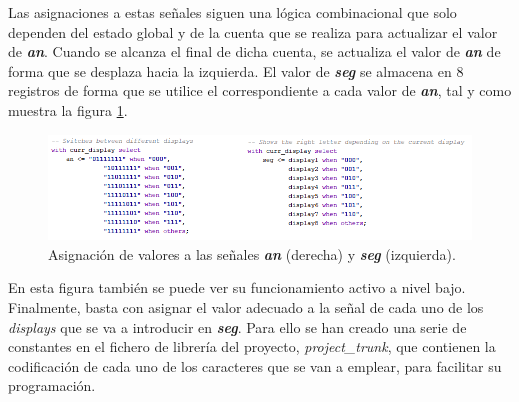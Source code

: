 Las asignaciones a estas señales siguen una lógica combinacional que solo dependen del estado global y de la cuenta que se realiza para actualizar el valor de \textbf{\emph{an}}. Cuando se alcanza el final de dicha cuenta, se actualiza el valor de \textbf{\emph{an}} de forma que se desplaza hacia la izquierda. El valor de \textbf{\emph{seg}} se almacena en 8 registros de forma que se utilice el correspondiente a cada valor de \textbf{\emph{an}}, tal y como muestra la figura \ref{fig:seg_an}.
\begin{figure}[!ht]
\begin{center}
\includegraphics[width=16cm]{img/segan.png}
\caption{\label{fig:seg_an}Asignación de valores a las señales \textbf{\emph{an}} (derecha) y \textbf{\emph{seg}} (izquierda).}
\end{center}
\end{figure}

En esta figura también se puede ver su funcionamiento activo a nivel bajo. Finalmente, basta con asignar el valor adecuado a la señal de cada uno de los \emph{displays} que se va a introducir en \textbf{\emph{seg}}. Para ello se han creado una serie de constantes en el fichero de librería del proyecto, \emph{project\_trunk}, que contienen la codificación de cada uno de los caracteres que se van a emplear, para facilitar su programación.